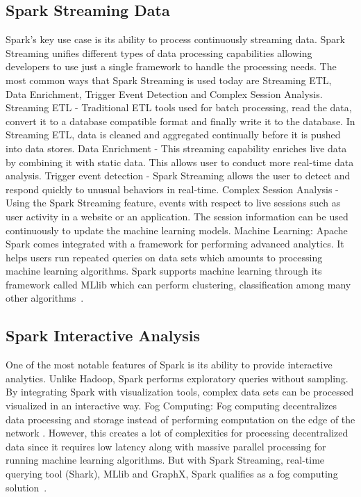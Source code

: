 \subsection{Spark Streaming Data}
Spark's key use case is its ability to process continuously 
streaming data. Spark Streaming unifies different types of data processing 
capabilities allowing developers to use just a single framework to handle the 
processing needs. The most common ways that Spark Streaming is used today are 
Streaming ETL, Data Enrichment, Trigger Event Detection and Complex Session 
Analysis. Streaming ETL - Traditional ETL tools used for batch processing, read 
the data, convert it to a database compatible format and finally write it to the
database. In Streaming ETL, data is cleaned and aggregated continually before it 
is pushed into data stores. Data Enrichment - This streaming capability enriches 
live data by combining it with static data. This allows user to conduct more 
real-time data analysis. Trigger event detection - Spark Streaming allows the 
user to detect and respond quickly to unusual behaviors in real-time. Complex 
Session Analysis - Using the Spark Streaming feature, events with respect to 
live sessions such as user activity in a website or an application. The 
session information can be used continuously to update the machine learning 
models. 
Machine Learning: Apache Spark comes integrated with a framework for performing 
advanced analytics. It helps users run repeated queries on data sets which 
amounts to processing machine learning algorithms. Spark supports machine 
learning through its framework called MLlib which can perform clustering, 
classification among many other algorithms~\cite{hid-sp18-408-Spark-Use-Case}. 


\subsection{Spark Interactive Analysis}
One of the most notable features of Spark is its ability 
to provide interactive analytics. Unlike Hadoop, Spark performs exploratory 
queries without sampling. By integrating Spark with visualization tools, complex
data sets can be processed visualized in an interactive way.
Fog Computing: Fog computing decentralizes data processing and storage instead 
of performing computation on the edge of the network . However, this creates a 
lot of complexities for processing decentralized data since it requires low 
latency along with massive parallel processing for running machine learning 
algorithms.  But with Spark Streaming, real-time querying tool (Shark), MLlib 
and GraphX, Spark qualifies as a 
fog computing solution~\cite{hid-sp18-408-Spark-Use-Case}.


